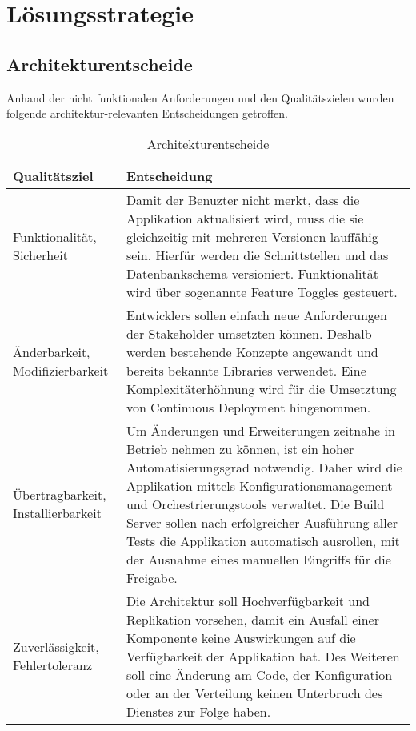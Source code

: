 \chapter{Lösungsstrategie}

\section{Architekturentscheide}

Anhand der nicht funktionalen Anforderungen und den Qualitätszielen wurden folgende architektur-relevanten Entscheidungen getroffen.

\begin{table}[H]
	\centering
	\caption{Architekturentscheide}
	\begin{tabular}{ | p{4cm} | p{11cm} | }
		\toprule
		{\textbf{Qualitätsziel}} & {\textbf{Entscheidung}} \\
		\midrule
		Funktionalität, Sicherheit &  Damit der Benuzter nicht merkt, dass die Applikation aktualisiert wird, muss die sie gleichzeitig mit mehreren Versionen lauffähig sein. Hierfür werden die Schnittstellen und das Datenbankschema versioniert. Funktionalität wird über sogenannte Feature Toggles gesteuert.\\ \hline
		Änderbarkeit, Modifizierbarkeit & Entwicklers sollen einfach neue Anforderungen der Stakeholder umsetzten können. Deshalb werden bestehende Konzepte angewandt und bereits bekannte Libraries verwendet. Eine Komplexitäterhöhnung wird für die Umsetztung von Continuous Deployment hingenommen. \\ \hline
		Übertragbarkeit, Installierbarkeit &  Um Änderungen und Erweiterungen zeitnahe in Betrieb nehmen zu können, ist ein hoher Automatisierungsgrad notwendig. Daher wird die Applikation mittels Konfigurationsmanagement- und Orchestrierungstools verwaltet. Die Build Server sollen nach erfolgreicher Ausführung aller Tests die Applikation automatisch ausrollen, mit der Ausnahme eines manuellen Eingriffs für die Freigabe.\\ \hline
		Zuverlässigkeit, Fehlertoleranz &  Die Architektur soll Hochverfügbarkeit und Replikation vorsehen, damit ein Ausfall einer Komponente keine Auswirkungen auf die Verfügbarkeit der Applikation hat. Des Weiteren soll eine Änderung am Code, der Konfiguration oder an der Verteilung keinen Unterbruch des Dienstes zur Folge haben.\\
		\bottomrule
	\end{tabular}
\end{table}

